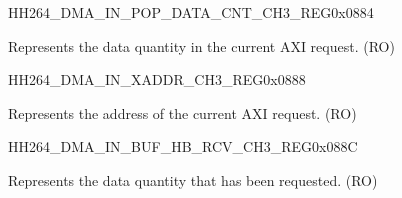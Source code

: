 \begin{register}{H}{H264\_DMA\_IN\_POP\_DATA\_CNT\_CH3\_REG}{0x0884}\label{regdesc:H264DMAINPOPDATACNTCH3REG}
%
%
\regnewline%
\begin{regdesc}\begin{reglist}
\label{fielddesc:H264DMAINCMDFIFOPOPDATACNTCH3}\item [H264\_DMA\_IN\_CMDFIFO\_POP\_DATA\_CNT\_CH3] Represents the data quantity in the current AXI request. (RO)
\end{reglist}\end{regdesc}
\end{register}


\begin{register}{H}{H264\_DMA\_IN\_XADDR\_CH3\_REG}{0x0888}\label{regdesc:H264DMAINXADDRCH3REG}
%
\regnewline%
\begin{regdesc}\begin{reglist}
\label{fielddesc:H264DMAINCMDFIFOXADDRCH3}\item [H264\_DMA\_IN\_CMDFIFO\_XADDR\_CH3] Represents the address of the current AXI request. (RO)
\end{reglist}\end{regdesc}
\end{register}


\begin{register}{H}{H264\_DMA\_IN\_BUF\_HB\_RCV\_CH3\_REG}{0x088C}\label{regdesc:H264DMAINBUFHBRCVCH3REG}
%
%
\regnewline%
\begin{regdesc}\begin{reglist}
\label{fielddesc:H264DMAINCMDFIFOBUFHBRCVCH3}\item [H264\_DMA\_IN\_CMDFIFO\_BUF\_HB\_RCV\_CH3] Represents the data quantity that has been requested. (RO)
\end{reglist}\end{regdesc}
\end{register}

